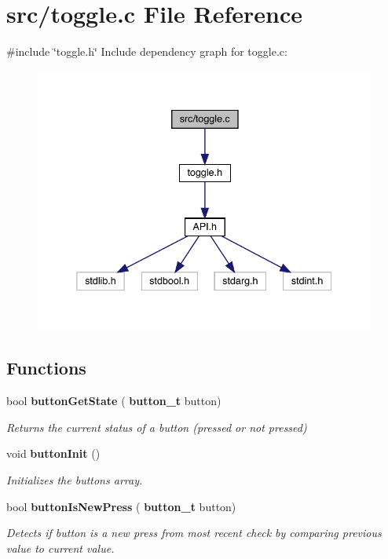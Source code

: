 \section{src/toggle.c File Reference}
\label{toggle_8c}
{\ttfamily \#include \char`\"{}toggle.\+h\char`\"{}}\newline
Include dependency graph for toggle.\+c\+:\nopagebreak
\begin{figure}[H]
\begin{center}
\leavevmode
\includegraphics[width=338pt]{toggle_8c__incl}
\end{center}
\end{figure}
\subsection*{Functions}
\begin{DoxyCompactItemize}
\item 
bool \textbf{ button\+Get\+State} (\textbf{ button\+\_\+t} button)
\begin{DoxyCompactList}\small\item\em Returns the current status of a button (pressed or not pressed) \end{DoxyCompactList}\item 
void \textbf{ button\+Init} ()
\begin{DoxyCompactList}\small\item\em Initializes the buttons array. \end{DoxyCompactList}\item 
bool \textbf{ button\+Is\+New\+Press} (\textbf{ button\+\_\+t} button)
\begin{DoxyCompactList}\small\item\em Detects if button is a new press from most recent check by comparing previous value to current value. \end{DoxyCompactList}\end{DoxyCompactItemize}
